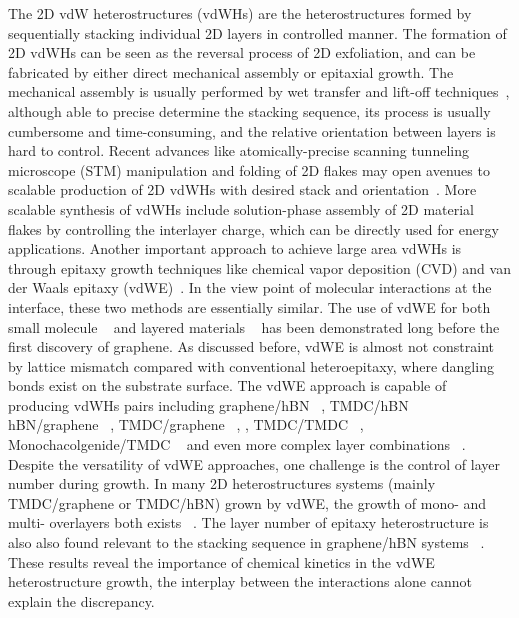 The 2D vdW heterostructures (vdWHs) are the heterostructures formed by
sequentially stacking individual 2D layers in controlled manner. The
formation of 2D vdWHs can be seen as the reversal process of 2D
exfoliation, and can be fabricated by either direct mechanical
assembly or epitaxial growth.
%
The mechanical assembly is usually performed by wet transfer and
lift-off techniques~\autocite{Novoselov_2016_vdW},
although able to precise determine the stacking
sequence, its process is usually cumbersome and time-consuming, and
the relative orientation between layers is hard to
control.
Recent advances like atomically-precise scanning tunneling microscope
(STM) manipulation and folding of 2D flakes may open avenues to
scalable production of 2D vdWHs with desired stack and
orientation~\autocite{Chen_2019_STM_graphene}.
%
More scalable synthesis of vdWHs include solution-phase assembly of 2D
material flakes by controlling the interlayer charge, which can be
directly used for energy applications.
%
Another important approach to achieve large area vdWHs is through
epitaxy growth techniques like chemical vapor deposition (CVD) and van
der Waals epitaxy (vdWE)~\autocite{Novoselov_2016_vdW}. In the view point
of molecular interactions at the interface, these two methods are
essentially similar. The use of vdWE for both small molecule
~\autocite{Hara_1989_ME,Sakurai_1991_c60_mos2} and layered materials
~\autocite{Koma_1985_vdWE,Ueno_1990_vdWE,Ohuchi_1990_MoSe2_SnS2,Parkinson_1991_vdWE}
has been demonstrated long before the first discovery of graphene. As
discussed before, vdWE is almost not constraint by lattice mismatch
compared with conventional heteroepitaxy, where dangling bonds exist
on the substrate surface.
%
The vdWE approach is capable of producing vdWHs pairs including
graphene/hBN ~\autocite{Yang_2013_gr_hBN}, TMDC/hBN
~\autocite{Yan_2015_MoS2_on_hBN,Wang_2015_cvd_MoS2_BN,
  Cattelan_2015_Ws2_hBN} hBN/graphene ~\autocite{Lin_2014_vdW_solid},
TMDC/graphene
~\autocite{Shi_2012_vdw_epi_MoS2_gr,McCreary_2014_MoS2_gr,Azizi_2015_Freevdw_Gr_TMDCs,Miwa_2015_MoS2_gr,Ago_2015_MoS2_Gr,Lin_2014_WS2_Gr,Lin_2015_Wse2_MoS2_gr},
, TMDC/TMDC ~\autocite{Diaz_2015_MoTe2_MoSe2,Gong_2014_WS2_MoS2},
Monochacolgenide/TMDC
~\autocite{Li_2016_GaSe_MoSe2_vdW,Zhang_2014_vdw_epi_SnS2_MoS2} and even
more complex layer combinations
~\autocite{Lin_2015_Wse2_MoS2_gr,Alemayehu_2015_TMDC_vdw}.
% 
Despite the versatility of vdWE approaches, one challenge is the
control of layer number  during growth.
%
In many 2D heterostructures systems (mainly TMDC/graphene or TMDC/hBN)
grown by vdWE, the growth of mono- and multi- overlayers both exists
~\autocite{Shi_2012_vdw_epi_MoS2_gr,Azizi_2015_Freevdw_Gr_TMDCs,Miwa_2015_MoS2_gr,Yan_2015_MoS2_on_hBN}.
%
The layer number of epitaxy heterostructure is also
also found relevant to the stacking sequence in graphene/hBN systems ~\autocite{Wu_2015_Gr_hBN,Yang_2013_gr_hBN,Wu_2015_Gr_hBN}.
%
These results reveal the
importance of chemical kinetics in the vdWE heterostructure growth,
the interplay between the interactions alone cannot explain the
discrepancy.

